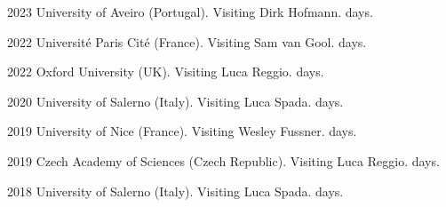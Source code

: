 \chronorow
  {2023}
  {{University of Aveiro} (Portugal).}
  {Visiting Dirk Hofmann.  days.}

\chronorow
  {2022}
  {{Université Paris Cité} (France).}
  {Visiting Sam van Gool.  days.}

\chronorow
  {2022}
  {{Oxford University} (UK).}
  {Visiting Luca Reggio.  days.}

\chronorow
  {2020}
  {{University of Salerno} (Italy).}
  {Visiting Luca Spada.  days.}

\chronorow
  {2019}
  {University of Nice (France).}
  {Visiting Wesley Fussner.  days.}

\chronorow
  {2019}
  {{Czech Academy of Sciences} (Czech Republic).}
  {Visiting Luca Reggio.  days.}

\chronorow
  {2018}
  {{University of Salerno} (Italy).}
  {Visiting Luca Spada.  days.}

